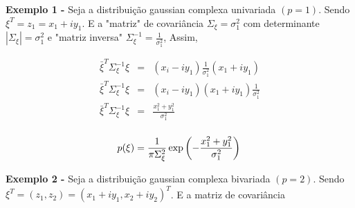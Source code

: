 \documentclass[12pt,a4paper]{article}
\begin{document}
{\bf Exemplo 1 -} Seja a distribuição gaussian complexa univariada $(p=1)$. Sendo $\xi^{T}=z_1=x_1+iy_1$. E a "matriz" de covariância $\Sigma_{\xi}=\sigma_{1}^{2}$ com determinante $|\Sigma_{\xi}|=\sigma_{1}^{2}$ e  "matriz inversa" $\Sigma_{\xi}^{-1}=\frac{1}{\sigma_{1}^{2}}$, Assim,

\begin{equation}\label{eqn70}
\begin{array}{ccc}
	\bar{\xi}^{T}\Sigma_{\xi}^{-1}\xi&=&(x_i-iy_1)\frac{1}{\sigma_1^2}(x_1+iy_1)  \\
	\bar{\xi}^{T}\Sigma_{\xi}^{-1}\xi&=&(x_i-iy_1)(x_1+iy_1)\frac{1}{\sigma_1^2}  \\
	\bar{\xi}^{T}\Sigma_{\xi}^{-1}\xi&=&\frac{x_1^2+y_1^2}{\sigma_1^2}  \\
\end{array}
\end{equation}


\begin{equation}\label{eqn71}
	p(\xi)=\frac{1}{\pi\Sigma_{\xi}^{2}}\exp\left(-\frac{x_1^2+y_1^2}{\sigma_1^2}\right)  \\
\end{equation}

{\bf Exemplo 2 -} Seja a distribuição gaussian complexa bivariada $(p=2)$. Sendo $\xi^{T}=(z_1, z_2)=(x_1 + iy_1, x_2 + iy_2)^{T}$. E a matriz de covariância 
\end{document}
